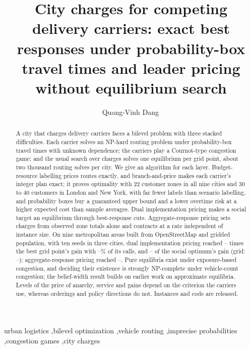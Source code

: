 \begin{frontmatter}

\title{City charges for competing delivery carriers: exact best responses under probability-box travel times and leader pricing without equilibrium search}

\author{Quang-Vinh Dang\,}
\address{British University Vietnam, Hung Yen, Vietnam}

\begin{abstract}
A city that charges delivery carriers faces a bilevel problem with three stacked difficulties. Each carrier solves an NP-hard routing problem under probability-box travel times with unknown dependence; the carriers play a Cournot-type congestion game; and the usual search over charges solves one equilibrium per grid point, about two thousand routing solves per city. We give an algorithm for each layer. Budget-resource labelling prices routes exactly, and branch-and-price makes each carrier's integer plan exact; it proves optimality with 22 customer zones in all nine cities and 30 to 40 customers in London and New York, with far fewer labels than scenario labelling, and probability boxes buy a guaranteed upper bound and a lower overtime risk at a higher expected cost than sample averages. Dual implementation pricing makes a social target an equilibrium through best-response cuts. Aggregate-response pricing sets charges from observed zone totals alone and contracts at a rate independent of instance size. On nine metropolitan areas built from OpenStreetMap and gridded population, with ten seeds in three cities, dual implementation pricing reached \TenDipGridBuenosAires--\TenDipGridNewDelhi{} times the best grid point's gain with \TenDipCallsNewDelhi--\TenDipCallsLondon\% of its calls, and \TenSoDipNewDelhi--\TenSoDipLondon{} of the social optimum's gain (grid: \TenSoGridNewDelhi--\TenSoGridBuenosAires); aggregate-response pricing reached \TenSoArpNewDelhi--\TenSoArpBuenosAires. Pure equilibria exist under exposure-based congestion, and deciding their existence is strongly NP-complete under vehicle-count congestion; the belief-width result builds on earlier work on approximate equilibria. Levels of the price of anarchy, service and gains depend on the criterion the carriers use, whereas orderings and policy directions do not. Instances and code are released.
\end{abstract}

\begin{keyword}
urban logistics \sep bilevel optimization \sep vehicle routing \sep imprecise probabilities \sep congestion games \sep city charges
\end{keyword}

\end{frontmatter}
